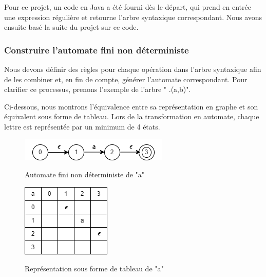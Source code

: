 \documentclass{article}
\begin{document}
Pour ce projet, un code en Java a été fourni dès le départ, qui prend en entrée une expression régulière et retourne l'arbre syntaxique correspondant. Nous avons ensuite basé la suite du projet sur ce code.
\subsubsection{Construire l’automate fini non déterministe}
Nous devons définir des règles pour chaque opération dans l'arbre syntaxique afin de les combiner et, en fin de compte, générer l'automate correspondant. Pour clarifier ce processus, prenons l'exemple de l'arbre " .(a,b)".

Ci-dessous, nous montrons l'équivalence entre sa représentation en graphe et son équivalent sous forme de tableau. Lors de la transformation en automate, chaque lettre est représentée par un minimum de 4 états.

\begin{figure}[h]
    \begin{minipage}{0.3\textwidth}
        \centering
        \includegraphics[width=\textwidth]{resourse/NDFA_a.png}
        \caption{Automate fini non déterministe de "a"}
        \label{fig:ndfa_a}
        \cite{ndfa_a}
    \end{minipage}
    \hspace{5cm} %
    \begin{minipage}{0.25\textwidth}
        \centering
        \includegraphics[width=\textwidth]{resourse/NDFA_a.tab.png}
        \caption{Représentation sous forme de tableau de "a"}
        \label{fig:ndfa_tab_a}
        \cite{ndfa_tab_a}
    \end{minipage}
\end{figure}
\end{document}
